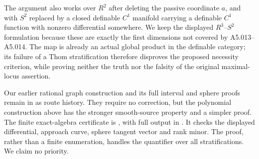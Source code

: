 The argument also works over $R^2$ after deleting the passive coordinate
$a$, and with $S^2$ replaced by a closed definable $C^1$ manifold carrying
a definable $C^1$ function with nonzero differential somewhere. We keep
the displayed $R^3$--$S^2$ formulation because these are exactly the first
dimensions not covered by A5.013--A5.014. The map is already an actual
global product in the definable category; its failure of a Thom
stratification therefore disproves the proposed necessity criterion,
while proving neither the truth nor the falsity of the original
maximal-locus assertion.

Our earlier rational graph construction and its full interval and sphere
proofs remain in
 as route
history. They require no correction, but the polynomial construction
above has the stronger smooth-source property and a simpler proof.
The finite exact-algebra certificate is
,
with full output in
.
It checks the displayed differential, approach curve, sphere tangent
vector and rank minor. The proof, rather than a finite enumeration,
handles the quantifier over all stratifications. We claim no priority.





